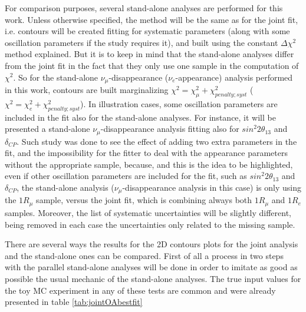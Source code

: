 For comparison purposes, several stand-alone analyses are performed for this work. Unless otherwise specified, the method will be the same as for the joint fit, i.e. contours will be created fitting for systematic parameters (along with some oscillation parameters if the study requires it), and built using the constant $\Delta\chi^{2}$ method explained. But it is to keep in mind that the stand-alone analyses differ from the joint fit in the fact that they only use one sample in the computation of $\chi^{2}$. So for the stand-alone $\nu_{\mu}$-disappearance ($\nu_{e}$-appearance) analysis performed in this work, contours are built marginalizing $\chi^{2}=\chi^{2}_{\mu}+\chi^{2}_{penalty;syst}$ ($\chi^{2}=\chi^{2}_{e}+\chi^{2}_{penalty;syst}$). In illustration cases, some oscillation parameters are included in the fit also for the stand-alone analyses. For instance, it will be presented a stand-alone $\nu_{\mu}$-disappearance analysis fitting also for $sin^{2}2\theta_{13}$ and $\delta_{CP}$. Such study was done to see the effect of adding two extra parameters in the fit, and the impossibility for the fitter to deal with the appearance parameters without the appropriate sample, because, and this is the idea to be highlighted, even if other oscillation parameters are included for the fit, such as $sin^{2}2\theta_{13}$ and $\delta_{CP}$, the stand-alone analysis ($\nu_{\mu}$-disappearance analysis in this case) is only using the $1R_{\mu}$ sample, versus the joint fit, which is combining always both $1R_{\mu}$ and $1R_{e}$ samples. Moreover, the list of systematic uncertainties will be slightly different, being removed in each case the uncertainties only related to the missing sample. 

{}

There are several ways the results for the 2D contours plots for the joint analysis and the stand-alone ones can be compared. First of all a process in two steps with the parallel stand-alone analyses will be done in order to imitate as good as possible the usual mechanic of the stand-alone analyses. The true input values for the toy MC experiment in any of these tests are common and were already presented in table \ref{tab:jointOAbestfit}

\renewcommand{\labelitemi}{$\bullet$} 


